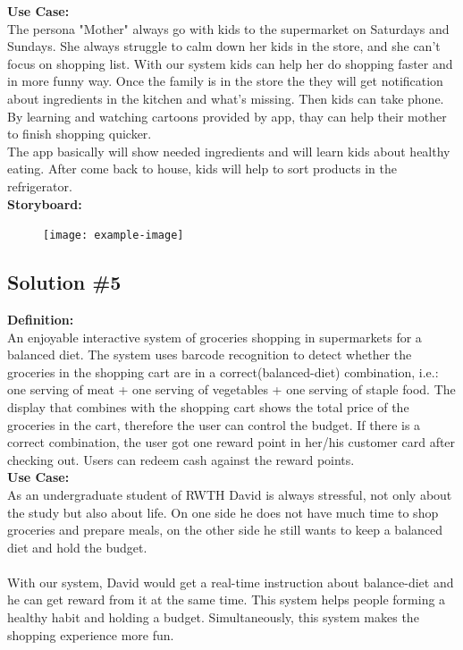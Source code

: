 \documentclass[a4paper,10pt,oneside]{scrreprt}
\begin{document}
			\noindent \textbf{Use Case:}\\
			The persona "Mother" always go with kids to the supermarket on Saturdays and  Sundays. She always struggle to calm down her kids in the store, and she can't focus on shopping list. With our system kids can help her do shopping faster and in more funny way. Once the family is in the store the they will get notification about ingredients in the kitchen and what's missing. Then kids can take phone. By learning and watching cartoons provided by app, thay can help their mother to finish shopping quicker.\\

			The app basically will show needed ingredients and will learn kids about healthy eating. After come back to house, kids will help to sort products in the refrigerator.\\

			\noindent \textbf{Storyboard:}\\

			\begin{figure}[H]
				\centering
				\texttt{[image: example-image]}
			\end{figure}

			\clearpage
			\subsection{Solution \#5}

				\noindent \textbf{Definition:}\\
				An enjoyable interactive system of groceries shopping in supermarkets for a balanced diet. The system uses barcode recognition to detect whether the groceries in the shopping cart are in a correct(balanced-diet) combination, i.e.: one serving of meat + one serving of vegetables + one serving of staple food. The display that combines with the shopping cart shows the total price of the groceries in the cart, therefore the user can control the budget. If there is a correct combination, the user got one reward point in her/his customer card after checking out. Users can redeem cash against the reward points.\\

				\noindent \textbf{Use Case:}\\
				As an undergraduate student of RWTH David is always stressful, not only about the study but also about life. On one side he does not have much time to shop groceries and prepare meals, on the other side he still wants to keep a balanced diet and hold the budget.\\
				\\
				With our system, David would get a real-time instruction about balance-diet and he can get reward from it at the same time. This system helps people forming a healthy habit and holding a budget. Simultaneously, this system makes the shopping experience more fun.\\
\end{document}
